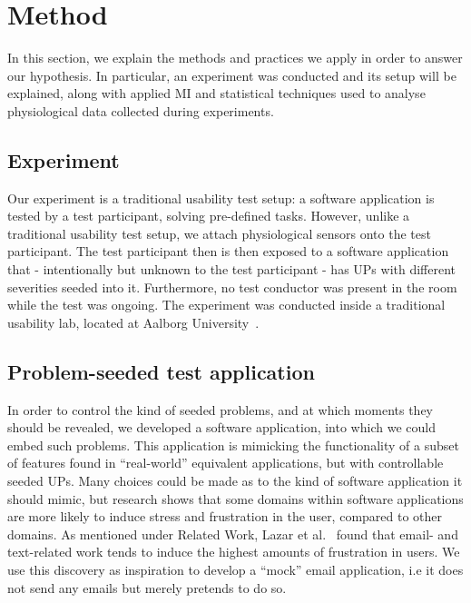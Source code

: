 \section{Method}
In this section, we explain the methods and practices we apply in order to answer our hypothesis. In particular, an
experiment was conducted and its setup will be explained, along with applied MI and statistical techniques used to
analyse physiological data collected during experiments.

\subsection{Experiment}
Our experiment is a traditional usability test setup: a software application is tested by a test participant, solving pre-defined tasks. 
However, unlike a traditional usability test setup, we attach physiological sensors onto the test participant.
The test participant then is then exposed to a software application that - intentionally but unknown to the test participant - has UPs with different severities seeded into it. 
Furthermore, no test conductor was present in the room while the test was ongoing.
The experiment was conducted inside a traditional usability lab, located at Aalborg University~\cite{usability_lab_cassiopeia}.


\subsection{Problem-seeded test application}
In order to control the kind of seeded problems, and at which moments they should be revealed, we developed a software
application, into which we could embed such problems. This application is mimicking the functionality of a subset of
features found in ``real-world'' equivalent applications, but with controllable seeded UPs.  Many choices could be
made as to the kind of software application it should mimic, but research shows that some domains within software
applications are more likely to induce stress and frustration in the user, compared to other domains.  As mentioned
under Related Work, Lazar et al.~\cite{frustration_with_computers} found that email- and text-related work tends to
induce the highest amounts of frustration in users. We use this discovery as inspiration to develop a ``mock'' email
application, i.e it does not send any emails but merely pretends to do so.

